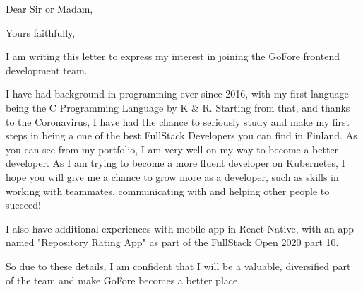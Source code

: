 \documentclass[11pt,a4paper,sans]{moderncv}
\begin{document}
  \clearpage

  \date{January 12, 2021}
  \opening{Dear Sir or Madam,}
  \closing{Yours faithfully,}
  \makelettertitle

  I am writing this letter to express my interest in joining the GoFore
  frontend development team.

  I have had background in programming ever since 2016, with my
  first language being the C Programming Language by K \& R. Starting
  from that, and thanks to the Coronavirus, I have had the chance
  to seriously study and make my first steps in being a
  one of the best FullStack Developers you can find in Finland.
  As you can see from my portfolio, I am very well on my way to become
  a better developer. As I am trying to become a more fluent developer on Kubernetes,
  I hope you will give me a chance to grow more as a developer,
  such as skills in working with teammates, communicating with and helping other
  people to succeed!

  I also have additional experiences with mobile app in React Native,
  with an app named "Repository Rating App" as part of the FullStack Open 2020
  part 10.

  So due to these details, I am confident that I will be a valuable, diversified
  part of the team and make GoFore becomes a better place.

  \makeletterclosing
\end{document}
